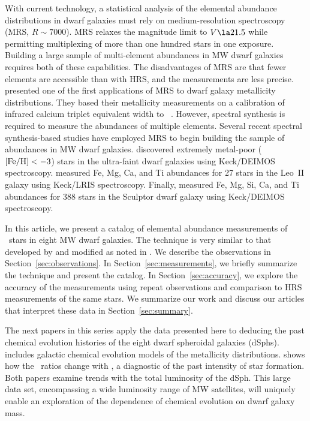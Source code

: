 \documentclass{emulateapj}
\begin{document}
With current technology, a statistical analysis of the elemental
abundance distributions in dwarf galaxies must rely on
medium-resolution spectroscopy (MRS, $R \sim 7000$).  MRS relaxes the
magnitude limit to $V \la 21.5$ while permitting multiplexing of more
than one hundred stars in one exposure.  Building a large sample of
multi-element abundances in MW dwarf galaxies requires both of these
capabilities.  The disadvantages of MRS are that fewer elements are
accessible than with HRS, and the measurements are less precise.
\citet{tol01} presented one of the first applications of MRS to dwarf
galaxy metallicity distributions.  They based their metallicity
measurements on a calibration of infrared calcium triplet equivalent
width to \feh\ \citep[e.g.,][]{arm91,rut97}.  However, spectral
synthesis is required to measure the abundances of multiple elements.
Several recent spectral synthesis-based studies have employed MRS to
begin building the sample of abundances in MW dwarf galaxies.
\citet{kir08b} discovered extremely metal-poor (${\rm [Fe/H]} < -3$) stars
in the ultra-faint dwarf galaxies using Keck/DEIMOS spectroscopy.
\citet{she09} measured Fe, Mg, Ca, and Ti abundances for 27 stars in
the Leo~II galaxy using Keck/LRIS spectroscopy.  Finally,
\citet[][Paper~I]{kir09} measured Fe, Mg, Si, Ca, and Ti abundances
for 388 stars in the Sculptor dwarf galaxy using Keck/DEIMOS
spectroscopy.

In this article, we present a catalog of elemental abundance
measurements of \ndsphstars\ stars in eight MW dwarf galaxies.  The
technique is very similar to that developed by \citet[][KGS08]{kir08a}
and modified as noted in \citeauthor*{kir09}.  We describe the
observations in Section~\ref{sec:observations}.  In
Section~\ref{sec:measurements}, we briefly summarize the technique and
present the catalog.  In Section~\ref{sec:accuracy}, we explore the
accuracy of the measurements using repeat observations and comparison
to HRS measurements of the same stars.  We summarize our work and
discuss our articles that interpret these data in
Section~\ref{sec:summary}.

The next papers in this series apply the data presented here to
deducing the past chemical evolution histories of the eight dwarf
spheroidal galaxies (dSphs).  \citeauthor*{kir10b} \citep{kir10b}
includes galactic chemical evolution models of the metallicity
distributions.  \citeauthor*{kir10a} \citep{kir10a} shows how the
\afe\ ratios change with \feh, a diagnostic of the past intensity of
star formation.  Both papers examine trends with the total luminosity
of the dSph.  This large data set, encompassing a wide luminosity
range of MW satellites, will uniquely enable an exploration of the
dependence of chemical evolution on dwarf galaxy mass.
\end{document}
